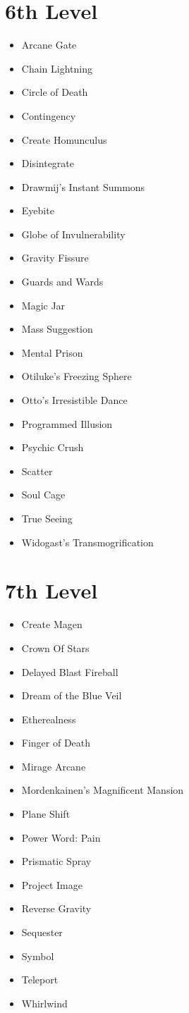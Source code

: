 \documentclass[a4paper,10pt,twoside,twocolumn, bg=print]{dndbook} %
\begin{document}
		\section{6th Level}
			\begin{itemize}
				\item Arcane Gate
				\item Chain Lightning
				\item Circle of Death
				\item Contingency
				\item Create Homunculus
				\item Disintegrate
				\item Drawmij's Instant Summons
				\item Eyebite
				\item Globe of Invulnerability
				\item Gravity Fissure
				\item Guards and Wards
				\item Magic Jar
				\item Mass Suggestion
				\item Mental Prison
				\item Otiluke's Freezing Sphere
				\item Otto's Irresistible Dance
				\item Programmed Illusion
				\item Psychic Crush
				\item Scatter
				\item Soul Cage
				\item True Seeing
				\item Widogast's Transmogrification
			\end{itemize}
		\section{7th Level}
			\begin{itemize}
				\item Create Magen
				\item Crown Of Stars
				\item Delayed Blast Fireball
				\item Dream of the Blue Veil
				\item Etherealness
				\item Finger of Death
				\item Mirage Arcane
				\item Mordenkainen's Magnificent Mansion
				\item Plane Shift
				\item Power Word: Pain
				\item Prismatic Spray
				\item Project Image
				\item Reverse Gravity
				\item Sequester
				\item Symbol
				\item Teleport
				\item Whirlwind
			\end{itemize}
\end{document}

